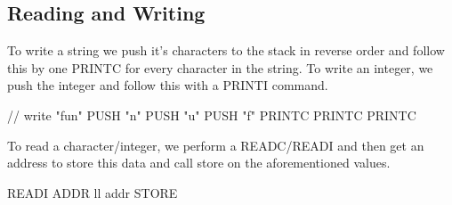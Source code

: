 \subsection{Reading and Writing}

To write a string we push it's characters to the stack in reverse order and follow
this by one PRINTC for every character in the string. To write an integer, we push
the integer and follow this with a PRINTI command.

\begin{code}[Writing]
// write "fun"
PUSH "n"
PUSH "u"
PUSH "f"
PRINTC
PRINTC
PRINTC
\end{code}

To read a character/integer, we perform a READC/READI and then get an address to 
store this data and call store on the aforementioned values.

\begin{code}[Writing]
READI
ADDR ll addr
STORE
\end{code}
